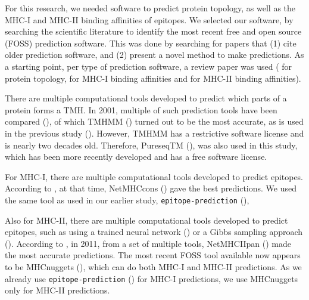 For this research, we needed software to predict protein
topology, as well as the MHC-I and MHC-II binding affinities
of epitopes. We selected our software, by
searching the scientific literature 
to identify the most recent free and open source (FOSS) 
prediction software.
This was done by searching for papers that (1) cite older
prediction software, and (2) present a novel method to make predictions.
As a starting point, per type of prediction software,
a review paper was used (\cite{moller2001evaluation} for protein
topology, \cite{lundegaard2011prediction} for MHC-I
binding affinities and \cite{nielsen2003reliable} for MHC-II binding
affinities). 


There are multiple computational tools developed to predict which
parts of a protein forms a TMH.
In 2001, multiple of such prediction tools have been compared (\cite{moller2001evaluation}),
of which TMHMM (\cite{krogh2001predicting}) turned out to be the most accurate, 
as is used in the previous study (\cite{bianchi2017}).
However, TMHMM has a restrictive software license and is nearly two
decades old.
Therefore, PureseqTM (\cite{wang2019efficient}),
was also used in this study, which has been more recently developed
and has a free software license.


For MHC-I, there are multiple computational tools developed 
to predict epitopes. 
According to \cite{lundegaard2011prediction}, at that time,
NetMHCcons (\cite{karosiene2012netmhccons}) gave the best predictions.
We used the same tool as used in our earlier study, \verb;epitope-prediction; (\cite{bianchi2017}),


Also for MHC-II, there are multiple computational tools developed 
to predict epitopes,
such as using a trained neural network (\cite{nielsen2003reliable})
or a Gibbs sampling approach (\cite{nielsen2004improved}).
According to \cite{lundegaard2011prediction}, in 2011,
from a set of multiple tools, 
NetMHCIIpan (\cite{nielsen2008quantitative,karosiene2013netmhciipan})
made the most accurate predictions.
The most recent FOSS tool available now appears
to be MHCnuggets (\cite{shao2020high}), which can do both MHC-I 
and MHC-II predictions. 
As we already use \verb;epitope-prediction; (\cite{bianchi2017}) 
for MHC-I predictions, we use MHCnuggets only for MHC-II predictions.

